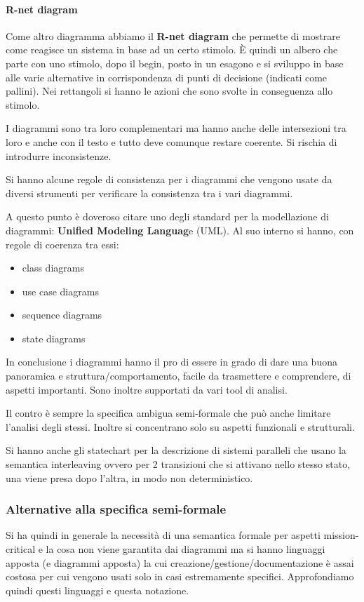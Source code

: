 \paragraph{R-net diagram}
Come altro diagramma abbiamo il \textbf{R-net diagram} che permette di mostrare come reagisce un sistema in base ad un certo stimolo. È quindi un albero che parte con uno stimolo, dopo il begin, posto in un esagono e si sviluppo in base alle varie alternative in corrispondenza di punti di decisione (indicati come pallini). Nei rettangoli si hanno le azioni che sono svolte in conseguenza allo stimolo. 

I diagrammi sono tra loro complementari ma hanno anche delle intersezioni tra loro e anche con il testo e tutto deve comunque restare coerente. Si rischia di introdurre inconsistenze.

Si hanno alcune regole di consistenza per i diagrammi che vengono usate da diversi strumenti per verificare la consistenza tra i vari diagrammi.

A questo punto è doveroso citare uno degli standard per la modellazione di diagrammi: \textbf{Unified Modeling Languag}e (UML). Al suo interno si hanno, con regole di coerenza tra essi:
\begin{itemize}
\item class diagrams
\item use case diagrams
\item sequence diagrams
\item state diagrams
\end{itemize}

In conclusione i diagrammi hanno il pro di essere in grado di dare una buona panoramica e struttura/comportamento, facile da trasmettere e comprendere, di aspetti importanti. Sono inoltre supportati da vari tool di analisi. 

Il contro è sempre la specifica ambigua semi-formale che può anche limitare l'analisi degli stessi. Inoltre si concentrano solo su aspetti funzionali e strutturali.

Si hanno anche gli statechart per la descrizione di sistemi paralleli che usano la semantica interleaving ovvero per 2 transizioni che si attivano nello stesso stato, una viene presa dopo l'altra, in modo non deterministico. 
\subsubsection{Alternative alla specifica semi-formale}
Si ha quindi in generale la necessità di una semantica formale per aspetti mission-critical e la cosa non viene garantita dai diagrammi ma si hanno linguaggi apposta (e diagrammi apposta) la cui creazione/gestione/documentazione è assai costosa per cui vengono usati solo in casi estremamente specifici. Approfondiamo quindi questi linguaggi e questa notazione.

